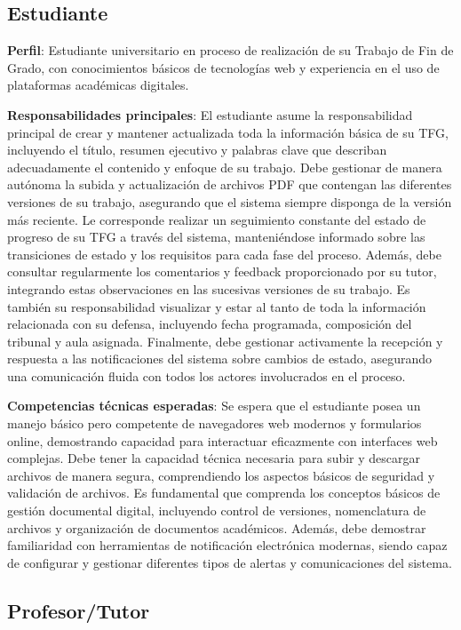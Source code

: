 \documentclass[12pt,a4paper,oneside]{report}
\begin{document}
\subsection{Estudiante}\label{estudiante}

\textbf{Perfil}: Estudiante universitario en proceso de realización de
su Trabajo de Fin de Grado, con conocimientos básicos de tecnologías web
y experiencia en el uso de plataformas académicas digitales.

\textbf{Responsabilidades principales}: El estudiante asume la responsabilidad principal de crear y mantener actualizada toda la información básica de su TFG, incluyendo el título, resumen ejecutivo y palabras clave que describan adecuadamente el contenido y enfoque de su trabajo. Debe gestionar de manera autónoma la subida y actualización de archivos PDF que contengan las diferentes versiones de su trabajo, asegurando que el sistema siempre disponga de la versión más reciente. Le corresponde realizar un seguimiento constante del estado de progreso de su TFG a través del sistema, manteniéndose informado sobre las transiciones de estado y los requisitos para cada fase del proceso. Además, debe consultar regularmente los comentarios y feedback proporcionado por su tutor, integrando estas observaciones en las sucesivas versiones de su trabajo. Es también su responsabilidad visualizar y estar al tanto de toda la información relacionada con su defensa, incluyendo fecha programada, composición del tribunal y aula asignada. Finalmente, debe gestionar activamente la recepción y respuesta a las notificaciones del sistema sobre cambios de estado, asegurando una comunicación fluida con todos los actores involucrados en el proceso.

\textbf{Competencias técnicas esperadas}: Se espera que el estudiante posea un manejo básico pero competente de navegadores web modernos y formularios online, demostrando capacidad para interactuar eficazmente con interfaces web complejas. Debe tener la capacidad técnica necesaria para subir y descargar archivos de manera segura, comprendiendo los aspectos básicos de seguridad y validación de archivos. Es fundamental que comprenda los conceptos básicos de gestión documental digital, incluyendo control de versiones, nomenclatura de archivos y organización de documentos académicos. Además, debe demostrar familiaridad con herramientas de notificación electrónica modernas, siendo capaz de configurar y gestionar diferentes tipos de alertas y comunicaciones del sistema.

\subsection{Profesor/Tutor}\label{profesortutor}
\end{document}
